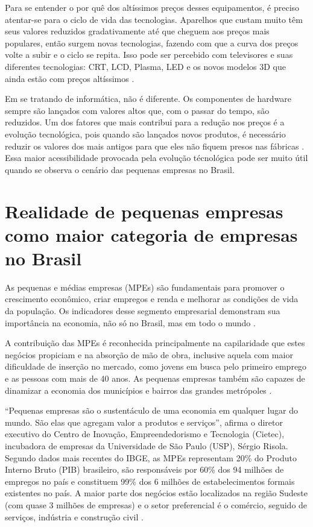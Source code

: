 Para se entender o por quê dos altíssimos preços desses equipamentos, é preciso atentar-se para o ciclo de vida das tecnologias. Aparelhos que custam muito têm seus valores reduzidos gradativamente até que cheguem aos preços mais populares, então surgem novas tecnologias, fazendo com que a curva dos preços volte a subir e o ciclo se repita. Isso pode ser percebido com televisores e suas diferentes tecnologias: CRT, LCD, Plasma, LED e os novos modelos 3D que ainda estão com preços altíssimos \cite{HAMANN}.

Em se tratando de informática, não é diferente. Os componentes de hardware sempre são lançados com valores altos que, com o passar do tempo, são reduzidos. Um dos fatores que mais contribui para a redução nos preços é a evolução tecnológica, pois quando são lançados novos produtos, é necessário reduzir os valores dos mais antigos para que eles não fiquem presos nas fábricas \cite{HAMANN}. Essa maior acessibilidade provocada pela evolução técnológica pode ser muito útil quando se observa o cenário das pequenas empresas no Brasil.

\section{Realidade de pequenas empresas como maior categoria de empresas no Brasil}

As pequenas e médias empresas (MPEs) são fundamentais para promover o crescimento econômico, criar empregos e renda e melhorar as condições de vida da população. Os indicadores desse segmento empresarial demonstram sua importância na economia, não só no Brasil, mas em todo o mundo \cite{PORTALBRASIL}.

A contribuição das MPEs é reconhecida principalmente na capilaridade que estes negócios propiciam e na absorção de mão de obra, inclusive aquela com maior dificuldade de inserção no mercado, como jovens em busca pelo primeiro emprego e as pessoas com mais de 40 anos. As pequenas empresas também são capazes de dinamizar a economia dos municípios e bairros das grandes metrópoles \cite{PORTALBRASIL}.

“Pequenas empresas são o sustentáculo de uma economia em qualquer lugar do mundo. São elas que agregam valor a produtos e serviços”, afirma o diretor executivo do Centro de Inovação, Empreendedorismo e Tecnologia (Cietec), incubadora de empresas da Universidade de São Paulo (USP), Sérgio Risola. Segundo dados mais recentes do IBGE, as MPEs representam 20\% do Produto Interno Bruto (PIB) brasileiro, são responsáveis por 60\% dos 94 milhões de empregos no país e constituem 99\% dos 6 milhões de estabelecimentos formais existentes no país. A maior parte dos negócios estão localizados na região Sudeste (com quase 3 milhões de empresas) e o setor preferencial é o comércio, seguido de serviços, indústria e construção civil \cite{PORTALBRASIL}.

